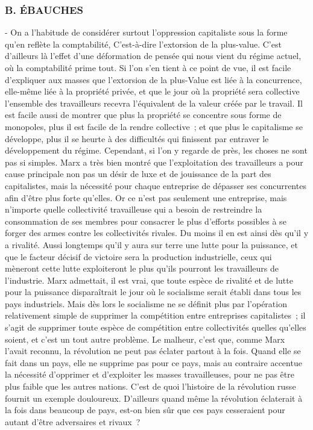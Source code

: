\documentclass[french,twoside]{book} %
\begin{document}
\subsubsection[{B. ÉBAUCHES}]{B. ÉBAUCHES}
 - On a l'habitude de considérer surtout l'oppression capitaliste sous la forme qu'en reflète la comptabilité, C'est-à-dire l'extorsion de la plus-value. C'est d'ailleurs là l'effet d'une déformation de pensée qui nous vient du régime actuel, où la comptabilité prime tout. Si l'on s'en tient à ce point de vue, il est facile d'expliquer aux masses que l'extorsion de la plus-Value est liée à la concurrence, elle-même liée à la propriété privée, et que le jour où la propriété sera collective l'ensemble des travailleurs recevra l'équivalent de la valeur créée par le travail. Il est facile aussi de montrer que plus la propriété se concentre sous forme de monopoles, plus il est facile de la rendre collective ; et que plus le capitalisme se développe, plus il se heurte à des difficultés qui finissent par entraver le développement du régime. Cependant, si l'on y regarde de près, les choses ne sont pas si simples. Marx a très bien montré que l'exploitation des travailleurs a pour cause principale non pas un désir de luxe et de jouissance de la part des capitalistes, mais la nécessité pour chaque entreprise de dépasser ses concurrentes afin d'être plus forte qu'elles. Or ce n'est pas seulement une entreprise, mais n'importe quelle collectivité travailleuse qui a besoin de restreindre la consommation de ses membres pour consacrer le plus d'efforts possibles à se forger des armes contre les collectivités rivales. Du moins il en est ainsi dès qu'il y a rivalité. Aussi longtemps qu'il y aura sur terre une lutte pour la puissance, et que le facteur décisif de victoire sera la production industrielle, ceux qui mèneront cette lutte exploiteront le plus qu'ils pourront les travailleurs de l'industrie. Marx admettait, il est vrai, que toute espèce de rivalité et de lutte pour la puissance disparaîtrait le jour où le socialisme serait établi dans tous les pays industriels. Mais dès lors le socialisme ne se définit plus par l'opération relativement simple de supprimer la compétition entre entreprises capitalistes ; il s'agit de supprimer toute espèce de compétition entre collectivités quelles qu'elles soient, et c'est un tout autre problème. Le malheur, c'est que, comme Marx l'avait reconnu, la révolution ne peut pas éclater partout à la fois. Quand elle se fait dans un pays, elle ne supprime pas pour ce pays, mais au contraire accentue la nécessité d'opprimer et d'exploiter les masses travailleuses, pour ne pas être plus faible que les autres nations. C'est de quoi l'histoire de la révolution russe fournit un exemple douloureux. D'ailleurs quand même la révolution éclaterait à la fois dans beaucoup de pays, est-on bien sûr que ces pays cesseraient pour autant d'être adversaires et rivaux ?\par
\end{document}
